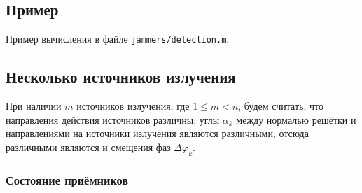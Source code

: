 \subsection{Пример}

Пример вычисления в файле \texttt{jammers/detection.m}.

\subsection{Несколько источников излучения}

При наличии $m$ источников излучения, где $1 \le m < n$, будем считать, что направления действия источников различны: углы $\alpha_k$ между нормалью решётки и направлениями
на источники излучения являются различными, отсюда различными являются и смещения фаз $\Delta \varphi_k$.

\subsubsection{Состояние приёмников}

